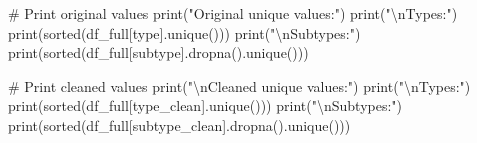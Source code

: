 \documentclass[
  letterpaper,
  DIV=11,
  numbers=noendperiod]{scrartcl}
\newenvironment{Shaded}{\begin{snugshade}}{\end{snugshade}}
\newcommand{\BuiltInTok}[1]{\textcolor[rgb]{0.00,0.23,0.31}{#1}}
\newcommand{\CharTok}[1]{\textcolor[rgb]{0.13,0.47,0.30}{#1}}
\newcommand{\CommentTok}[1]{\textcolor[rgb]{0.37,0.37,0.37}{#1}}
\newcommand{\NormalTok}[1]{\textcolor[rgb]{0.00,0.23,0.31}{#1}}
\newcommand{\StringTok}[1]{\textcolor[rgb]{0.13,0.47,0.30}{#1}}
\begin{document}
\begin{Shaded}
\begin{Highlighting}[]
\CommentTok{\# Print original values}
\BuiltInTok{print}\NormalTok{(}\StringTok{"Original unique values:"}\NormalTok{)}
\BuiltInTok{print}\NormalTok{(}\StringTok{"}\CharTok{\textbackslash{}n}\StringTok{Types:"}\NormalTok{)}
\BuiltInTok{print}\NormalTok{(}\BuiltInTok{sorted}\NormalTok{(df\_full[}\StringTok{\textquotesingle{}type\textquotesingle{}}\NormalTok{].unique()))}
\BuiltInTok{print}\NormalTok{(}\StringTok{"}\CharTok{\textbackslash{}n}\StringTok{Subtypes:"}\NormalTok{)}
\BuiltInTok{print}\NormalTok{(}\BuiltInTok{sorted}\NormalTok{(df\_full[}\StringTok{\textquotesingle{}subtype\textquotesingle{}}\NormalTok{].dropna().unique()))}

\CommentTok{\# Print cleaned values}
\BuiltInTok{print}\NormalTok{(}\StringTok{"}\CharTok{\textbackslash{}n}\StringTok{Cleaned unique values:"}\NormalTok{)}
\BuiltInTok{print}\NormalTok{(}\StringTok{"}\CharTok{\textbackslash{}n}\StringTok{Types:"}\NormalTok{)}
\BuiltInTok{print}\NormalTok{(}\BuiltInTok{sorted}\NormalTok{(df\_full[}\StringTok{\textquotesingle{}type\_clean\textquotesingle{}}\NormalTok{].unique()))}
\BuiltInTok{print}\NormalTok{(}\StringTok{"}\CharTok{\textbackslash{}n}\StringTok{Subtypes:"}\NormalTok{)}
\BuiltInTok{print}\NormalTok{(}\BuiltInTok{sorted}\NormalTok{(df\_full[}\StringTok{\textquotesingle{}subtype\_clean\textquotesingle{}}\NormalTok{].dropna().unique()))}
\end{Highlighting}
\end{Shaded}
\end{document}
